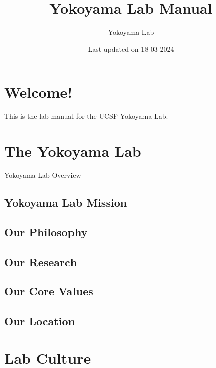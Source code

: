 \documentclass[
]{book}
\title{Yokoyama Lab Manual}
\author{Yokoyama Lab}
\date{Last updated on 18-03-2024}
\begin{document}
\maketitle

{
\setcounter{tocdepth}{1}
\tableofcontents
}
\hypertarget{welcome}{%
\chapter*{Welcome!}\label{welcome}}

This is the lab manual for the UCSF Yokoyama Lab.

\hypertarget{the-lab}{%
\chapter{The Yokoyama Lab}\label{the-lab}}

Yokoyama Lab Overview

\hypertarget{lab-mission}{%
\section{Yokoyama Lab Mission}\label{lab-mission}}

\hypertarget{lab-philosophy}{%
\section{Our Philosophy}\label{lab-philosophy}}

\hypertarget{our-research}{%
\section{Our Research}\label{our-research}}

\hypertarget{lab-values}{%
\section{Our Core Values}\label{lab-values}}

\hypertarget{our-location}{%
\section{Our Location}\label{our-location}}

\hypertarget{lab-culture}{%
\chapter{Lab Culture}\label{lab-culture}}
\end{document}
